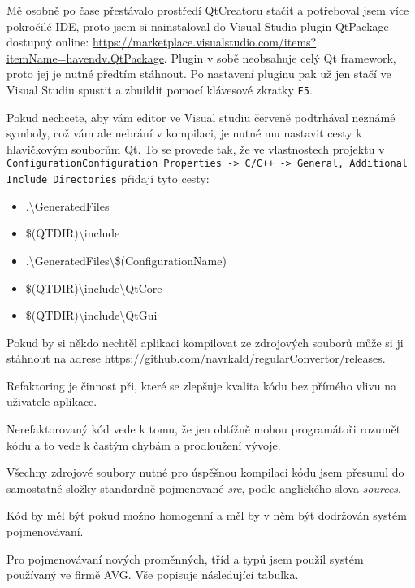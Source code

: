 Mě osobně po čase přestávalo prostředí QtCreatoru stačit a potřeboval jsem více pokročilé IDE, proto jsem si nainstaloval do Visual Studia plugin QtPackage dostupný online: \url{https://marketplace.visualstudio.com/items?itemName=havendv.QtPackage}. Plugin v sobě neobsahuje celý Qt framework, proto jej je nutné předtím stáhnout. Po nastavení pluginu pak už jen stačí ve Visual Studiu spustit a zbuildit pomocí klávesové zkratky \texttt{F5}.

Pokud nechcete, aby vám editor ve Visual studiu červeně podtrhával neznámé symboly, což vám ale nebrání v kompilaci, je nutné mu nastavit cesty k hlavičkovým souborům Qt. To se provede tak, že ve vlastnostech projektu v \texttt{ConfigurationConfiguration Properties -> C/C++ -> General, Additional Include Directories} přidají tyto cesty: 
\begin{itemize}
	\item .\textbackslash GeneratedFiles
	\item \$(QTDIR)\textbackslash include
	\item .\textbackslash GeneratedFiles\textbackslash\$(ConfigurationName)
	\item \$(QTDIR)\textbackslash include\textbackslash QtCore
	\item \$(QTDIR)\textbackslash include\textbackslash QtGui
\end{itemize}

Pokud by si někdo nechtěl aplikaci kompilovat ze zdrojových souborů může si ji stáhnout na adrese \url{https://github.com/navrkald/regularConvertor/releases}.


Refaktoring je činnost při, které se zlepšuje kvalita kódu bez přímého vlivu na uživatele aplikace.

Nerefaktorovaný kód vede k tomu, že jen obtížně mohou programátoři rozumět kódu a to vede k častým chybám a prodloužení vývoje.

Všechny zdrojové soubory nutné pro úspěšnou kompilaci kódu jsem přesunul do samostatné složky standardně pojmenované \textit{src}, podle anglického slova \textit{sources}.

Kód by měl být pokud možno homogenní a měl by v něm být dodržován systém pojmenovávaní. 


Pro pojmenovávaní nových proměnných, tříd a typů jsem použil systém používaný ve firmě AVG.
Vše popisuje následující tabulka.

